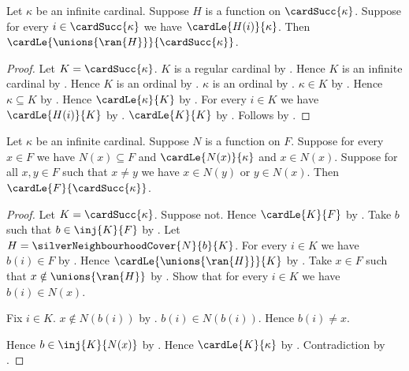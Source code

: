 \begin{proposition}\label{successor_indexed_union_bound}
    Let $\kappa$ be an infinite cardinal.
    Suppose $H$ is a function on $\cardSucc{\kappa}$.
    Suppose for every $i\in\cardSucc{\kappa}$ we have
        $\cardLe{H(i)}{\kappa}$.
    Then $\cardLe{\unions{\ran{H}}}{\cardSucc{\kappa}}$.
\end{proposition}
\begin{proof}
    Let $K=\cardSucc{\kappa}$.
    $K$ is a regular cardinal
        by .
    Hence $K$ is an infinite cardinal by .
    Hence $K$ is an ordinal by .
    $\kappa$ is an ordinal by .
    $\kappa\in K$ by .
    Hence $\kappa\subseteq K$ by .
    Hence $\cardLe{\kappa}{K}$ by .
    For every $i\in K$ we have $\cardLe{H(i)}{K}$
        by .
    $\cardLe{K}{K}$ by .
    Follows by .
\end{proof}

\begin{theorem}\label{oriented_neighbourhood_successor_bound}
    Let $\kappa$ be an infinite cardinal.
    Suppose $N$ is a function on $F$.
    Suppose for every $x\in F$ we have $N(x)\subseteq F$ and
        $\cardLe{N(x)}{\kappa}$ and $x\in N(x)$.
    Suppose for all $x,y\in F$ such that $x\neq y$ we have
        $x\in N(y)$ or $y\in N(x)$.
    Then $\cardLe{F}{\cardSucc{\kappa}}$.
\end{theorem}
\begin{proof}
    Let $K=\cardSucc{\kappa}$.
    Suppose not.
    Hence $\cardLe{K}{F}$ by .
    Take $b$ such that $b\in\inj{K}{F}$ by .
    Let $H=\silverNeighbourhoodCover{N}{b}{K}$.
    For every $i\in K$ we have $b(i)\in F$
        by .
    Hence $\cardLe{\unions{\ran{H}}}{K}$
        by .
    Take $x\in F$ such that $x\notin\unions{\ran{H}}$
        by .
    Show that for every $i\in K$ we have $b(i)\in N(x)$.
    \begin{subproof}
        Fix $i\in K$.
        $x\notin N(b(i))$
            by .
        $b(i)\in N(b(i))$.
        Hence $b(i)\neq x$.
    \end{subproof}
    Hence $b\in\inj{K}{N(x)}$
        by .
    Hence $\cardLe{K}{\kappa}$
        by .
    Contradiction by .
\end{proof}

